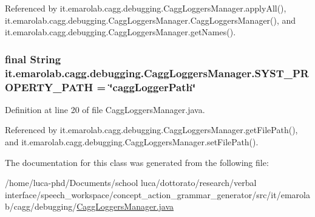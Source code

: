 Referenced by it.\-emarolab.\-cagg.\-debugging.\-Cagg\-Loggers\-Manager.\-apply\-All(), it.\-emarolab.\-cagg.\-debugging.\-Cagg\-Loggers\-Manager.\-Cagg\-Loggers\-Manager(), and it.\-emarolab.\-cagg.\-debugging.\-Cagg\-Loggers\-Manager.\-get\-Names().

\hypertarget{classit_1_1emarolab_1_1cagg_1_1debugging_1_1CaggLoggersManager_a4e1dd2229e2b86598fca025eb256d807}{
\subsubsection[{S\-Y\-S\-T\-\_\-\-P\-R\-O\-P\-E\-R\-T\-Y\-\_\-\-P\-A\-T\-H}]{\setlength{\rightskip}{0pt plus 5cm}final String it.\-emarolab.\-cagg.\-debugging.\-Cagg\-Loggers\-Manager.\-S\-Y\-S\-T\-\_\-\-P\-R\-O\-P\-E\-R\-T\-Y\-\_\-\-P\-A\-T\-H = \char`\"{}cagg\-Logger\-Path\char`\"{}\hspace{0.3cm}{\ttfamily [static]}}}\label{classit_1_1emarolab_1_1cagg_1_1debugging_1_1CaggLoggersManager_a4e1dd2229e2b86598fca025eb256d807}


Definition at line 20 of file Cagg\-Loggers\-Manager.\-java.



Referenced by it.\-emarolab.\-cagg.\-debugging.\-Cagg\-Loggers\-Manager.\-get\-File\-Path(), and it.\-emarolab.\-cagg.\-debugging.\-Cagg\-Loggers\-Manager.\-set\-File\-Path().



The documentation for this class was generated from the following file\-:\begin{DoxyCompactItemize}
\item 
/home/luca-\/phd/\-Documents/school luca/dottorato/research/verbal interface/speech\-\_\-workspace/concept\-\_\-action\-\_\-grammar\-\_\-generator/src/it/emarolab/cagg/debugging/\hyperlink{CaggLoggersManager_8java}{Cagg\-Loggers\-Manager.\-java}\end{DoxyCompactItemize}
